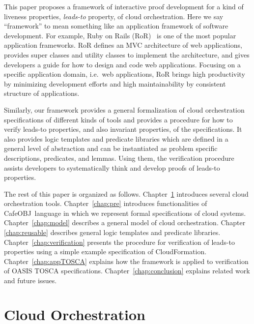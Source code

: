 \documentclass[12pt]{report}
\newcommand{\cafeobj}{{\sf CafeOBJ}~}
\begin{document}
This paper proposes a framework of interactive proof development for a
kind of liveness properties, {\it leads-to} property, of cloud
orchestration. Here we say ``framework'' to mean something like an
application framework of software development. For example, Ruby on
Rails (RoR)~\cite{RoR} is one of the most popular application
frameworks. RoR defines an MVC architecture of web applications,
provides super classes and utility classes to implement the
architecture, and gives developers a guide for how to design and code
web applications. Focusing on a specific application domain, i.e.\ web
applications, RoR brings high productivity by minimizing development
efforts and high maintainability by consistent structure of
applications.

Similarly, our framework provides a general formalization of cloud
orchestration specifications of different kinds of tools and provides
a procedure for how to verify leads-to properties, and also invariant
properties, of the specifications. It also provides logic templates
and predicate libraries which are defined in a general level of
abstraction and can be instantiated as problem specific descriptions,
predicates, and lemmas. Using them, the verification procedure assists
developers to systematically think and develop proofs of leads-to
properties.

The rest of this paper is organized as
follows. Chapter~\ref{chap:cloudorch} introduces several cloud
orchestration tools. Chapter~\ref{chap:pre} introduces functionalities
of \cafeobj language in which we represent formal specifications of
cloud systems. Chapter~\ref{chap:model} describes a general model of
cloud orchestration. Chapter \ref{chap:reusable} describes general
logic templates and predicate
libraries. Chapter~\ref{chap:verification} presents the procedure for
verification of leads-to properties using a simple example
specification of CloudFormation. Chapter~\ref{chap:appTOSCA} explains
how the framework is applied to verification of OASIS TOSCA
specifications.  Chapter~\ref{chap:conclusion} explains related work
and future issues.

\chapter{Cloud Orchestration}
\label{chap:cloudorch}

\end{document}
